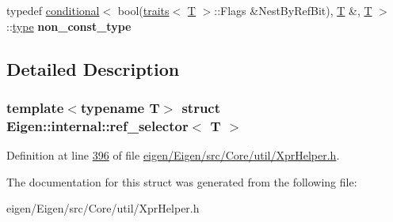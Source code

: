 \begin{DoxyCompactItemize}
\item 
\mbox{\label{struct_eigen_1_1internal_1_1ref__selector_a01ab072ffc5c112beb8021a3e8311b80}} 
typedef \hyperlink{struct_eigen_1_1internal_1_1conditional}{conditional}$<$ bool(\hyperlink{struct_eigen_1_1internal_1_1traits}{traits}$<$ \hyperlink{group___sparse_core___module}{T} $>$\+::Flags \&Nest\+By\+Ref\+Bit), \hyperlink{group___sparse_core___module}{T} \&, \hyperlink{group___sparse_core___module}{T} $>$\+::\hyperlink{class_eigen_1_1internal_1_1_tensor_lazy_evaluator_writable}{type} {\bfseries non\+\_\+const\+\_\+type}
\end{DoxyCompactItemize}


\subsection{Detailed Description}
\subsubsection*{template$<$typename T$>$\newline
struct Eigen\+::internal\+::ref\+\_\+selector$<$ T $>$}



Definition at line \hyperlink{eigen_2_eigen_2src_2_core_2util_2_xpr_helper_8h_source_l00396}{396} of file \hyperlink{eigen_2_eigen_2src_2_core_2util_2_xpr_helper_8h_source}{eigen/\+Eigen/src/\+Core/util/\+Xpr\+Helper.\+h}.



The documentation for this struct was generated from the following file\+:\begin{DoxyCompactItemize}
\item 
eigen/\+Eigen/src/\+Core/util/\+Xpr\+Helper.\+h\end{DoxyCompactItemize}
